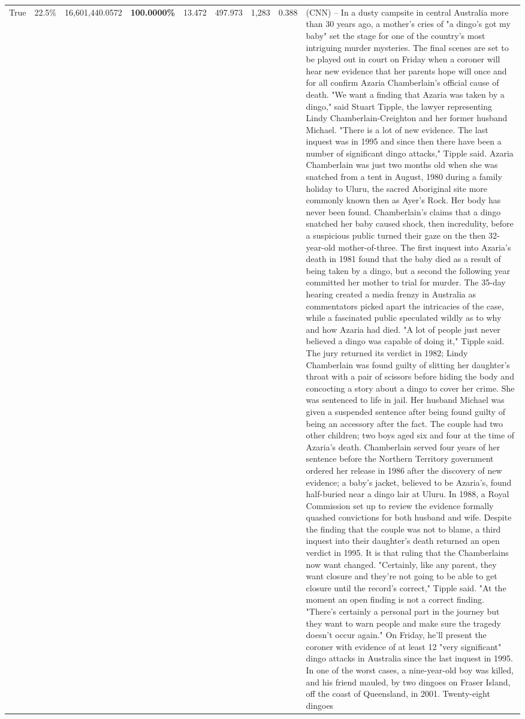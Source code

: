 \begin{table}[H]
\begin{tabular}{lllrlllll}
True & 22.5\% & 16,601,440.0572 & \bfseries \color{red} 100.0000\% & 13.472 & 497.973 & 1,283 & 0.388 & (CNN) -- In a dusty campsite in central Australia more than 30 years ago, a mother's cries of "a dingo's got my baby" set the stage for one of the country's most intriguing murder mysteries. The final scenes are set to be played out in court on Friday when a coroner will hear new evidence that her parents hope will once and for all confirm Azaria Chamberlain's official cause of death. "We want a finding that Azaria was taken by a dingo," said Stuart Tipple, the lawyer representing Lindy Chamberlain-Creighton and her former husband Michael. "There is a lot of new evidence. The last inquest was in 1995 and since then there have been a number of significant dingo attacks," Tipple said. Azaria Chamberlain was just two months old when she was snatched from a tent in August, 1980 during a family holiday to Uluru, the sacred Aboriginal site more commonly known then as Ayer's Rock. Her body has never been found. Chamberlain's claims that a dingo snatched her baby caused shock, then incredulity, before a suspicious public turned their gaze on the then 32-year-old mother-of-three. The first inquest into Azaria's death in 1981 found that the baby died as a result of being taken by a dingo, but a second the following year committed her mother to trial for murder. The 35-day hearing created a media frenzy in Australia as commentators picked apart the intricacies of the case, while a fascinated public speculated wildly as to why and how Azaria had died. "A lot of people just never believed a dingo was capable of doing it," Tipple said. The jury returned its verdict in 1982; Lindy Chamberlain was found guilty of slitting her daughter's throat with a pair of scissors before hiding the body and concocting a story about a dingo to cover her crime. She was sentenced to life in jail. Her husband Michael was given a suspended sentence after being found guilty of being an accessory after the fact. The couple had two other children; two boys aged six and four at the time of Azaria's death. Chamberlain served four years of her sentence before the Northern Territory government ordered her release in 1986 after the discovery of new evidence; a baby's jacket, believed to be Azaria's, found half-buried near a dingo lair at Uluru. In 1988, a Royal Commission set up to review the evidence formally quashed convictions for both husband and wife. Despite the finding that the couple was not to blame, a third inquest into their daughter's death returned an open verdict in 1995. It is that ruling that the Chamberlains now want changed. "Certainly, like any parent, they want closure and they're not going to be able to get closure until the record's correct," Tipple said. "At the moment an open finding is not a correct finding. "There's certainly a personal part in the journey but they want to warn people and make sure the tragedy doesn't occur again." On Friday, he'll present the coroner with evidence of at least 12 "very significant" dingo attacks in Australia since the last inquest in 1995. In one of the worst cases, a nine-year-old boy was killed, and his friend mauled, by two dingoes on Fraser Island, off the coast of Queensland, in 2001. Twenty-eight dingoes 
\end{tabular}
\end{table}
